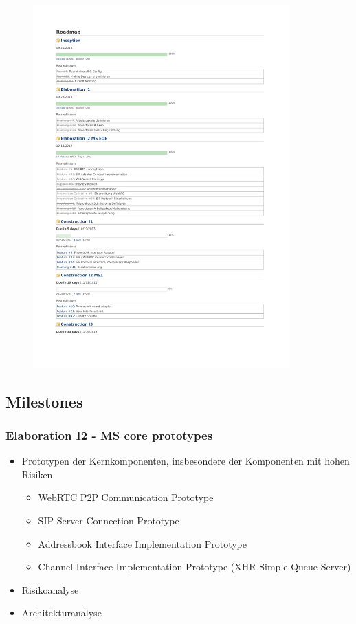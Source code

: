 	\begin{figure}[H]
		\includegraphics[trim=1.75cm 2cm 2cm 2.5cm, clip=true,page=2,width=0.88\textwidth]{media/roadmap.pdf}
	\end{figure}
	
	\subsection{Milestones}
		\subsubsection{Elaboration I2 - MS core prototypes}
			\begin{itemize}
				\item Prototypen der Kernkomponenten, insbesondere der Komponenten mit hohen Risiken
					\begin{itemize}
						\item WebRTC P2P Communication Prototype
						\item SIP Server Connection Prototype
						\item Addressbook Interface Implementation Prototype
						\item Channel Interface Implementation Prototype (XHR Simple Queue Server)
					\end{itemize}
				\item Risikoanalyse
				\item Architekturanalyse
			\end{itemize}
			
